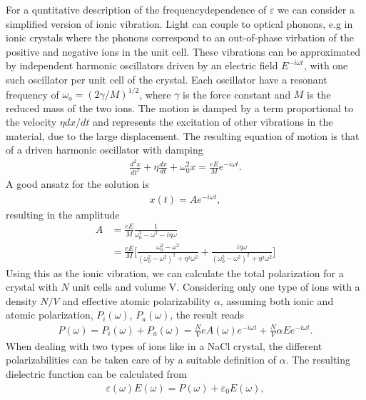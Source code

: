 For a quntitative description of the frequencydependence of $\varepsilon$ we can consider a simplified
version of ionic vibration.
Light can couple to optical phonons, e.g in ionic crystals where the phonons correspond to
an out-of-phase virbation of the positive and negative ions in the unit cell. 
These vibrations can be approximated by independent harmonic oscillators driven by an electric field
$E ^{-i\omega t}$, with one such oscillator per unit cell of the crystal. Each oscillator have a 
resonant frequency of $\omega_o = (2\gamma/M)^{1/2}$, where $\gamma$ is the force constant and
$M$ is the reduced mass of the two ions. The motion is damped by a term proportional to the velocity
$\eta d\!x\!/\!d\!t$ and represents the excitation of other vibrations in the material,
due to the large displacement. 
The resulting equation of motion is that of a driven harmonic oscillator with damping
\begin{align}
   \frac{d^2x}{dt^2} + \eta \frac{dx}{dt} + \omega_0^2 x = \frac{eE}{M}e^{-i\omega t}.
\end{align}
A good ansatz for the solution is 
\begin{align}
   x(t) = Ae^{-i \omega t},
\end{align}
resulting in the amplitude
\begin{align}
   A &= \frac{eE}{M} \frac{1}{\omega_0^2 - \omega^2 - i \eta \omega}  \\
     &=  \frac{eE}{M} \Bigg[ \frac{\omega_0^2 - \omega^2}{(\omega_0^2 - \omega^2)^2 +\eta^2 \omega^2} 
+ \frac{i\eta \omega}{(\omega_0^2 - \omega^2)^2 + \eta^2 \omega^2} \Bigg]
\end{align}
Using this as the ionic vibration, we can calculate the total polarization for a crystal with
$N$ unit cells and volume V. Considering only one type of ions with a density $N/V$ and effective
atomic polarizability $\alpha$, assuming both ionic and atomic polarization, $P_i(\omega)$, $P_a(\omega)$,
the result reads
\begin{align}
   P(\omega) = P_i(\omega) + P_a(\omega) = \frac{N}{V}eA(\omega)e^{-i \omega t} + \frac{N}{V}\alpha E e^{-i \omega t}.
\end{align}
When dealing with two types of ions like in a NaCl crystal, the different polarizabilities can be
taken care of by a suitable definition of $\alpha$. The resulting dielectric function can be calculated
from
\begin{align}
   \varepsilon (\omega) E(\omega) = P(\omega) + \varepsilon_0 E(\omega),
\end{align}
